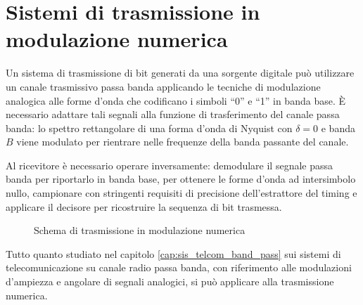 \chapter{Sistemi di trasmissione in modulazione numerica}
Un sistema di trasmissione di bit generati da una sorgente digitale può utilizzare un canale trasmissivo passa banda applicando le tecniche di modulazione analogica alle forme d'onda che codificano i simboli “0” e “1” in banda base. \`{E} necessario adattare tali segnali alla funzione di trasferimento del canale passa banda: lo spettro rettangolare di una forma d'onda di Nyquist con $\delta=0$ e banda $B$ viene modulato per rientrare nelle frequenze della banda passante del canale.

Al ricevitore è necessario operare inversamente: demodulare il segnale passa banda per riportarlo in banda base, per ottenere le forme d'onda ad intersimbolo nullo, campionare con stringenti requisiti di precisione dell'estrattore del timing e applicare il decisore per ricostruire la sequenza di bit trasmessa.

\begin{figure}[!ht]
	\centering
	\caption{Schema di trasmissione in modulazione numerica}
\end{figure}

Tutto quanto studiato nel capitolo \ref{cap:sis_telcom_band_pass} sui sistemi di telecomunicazione su canale radio passa banda, con riferimento alle modulazioni d'ampiezza e angolare di segnali analogici, si può applicare alla trasmissione numerica.

